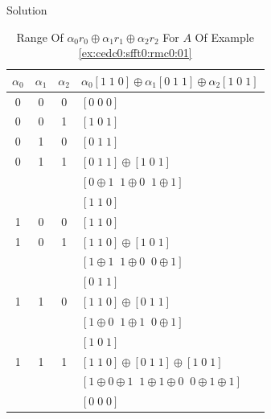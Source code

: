 \begin{vworkexampleparsection}{Solution}
\begin{table}
\caption{Range Of $\alpha_0 r_0 \oplus \alpha_1 r_1 \oplus \alpha_2 r_2$ For $A$ Of Example \ref{ex:cedc0:sfft0:rmc0:01}}
\label{tbl:cedc0:sfft0:rmc0:01}
\begin{center}
\begin{tabular}{|c|c|c|l|}
\hline
$\alpha_0$           &  $\alpha_1$                  & $\alpha_2$ &   $\alpha_0 [1 \; 1 \; 0] \oplus \alpha_1 [0 \; 1 \; 1] \oplus \alpha_2 [1 \; 0 \; 1]$   \\
\hline
\hline
0  & 0  & 0  & $[0\;0\;0]$ \\
\hline
0  & 0  & 1  & $[1\;0\;1]$ \\
\hline
0  & 1  & 0  & $[0\;1\;1]$ \\
\hline
0  & 1  & 1  & $[0\;1\;1] \oplus [1\;0\;1]$ \\
   &    &    & $[0 \oplus 1 \;\; 1 \oplus 0\;\; 1 \oplus 1]$ \\
   &    &    & $[1\;1\;0]$ \\
\hline
1  & 0  & 0  & $[1\;1\;0]$ \\
\hline
1  & 0  & 1  & $[1\;1\;0] \oplus [1\;0\;1]$ \\
   &    &    & $[1 \oplus 1 \;\; 1 \oplus 0\;\; 0 \oplus 1]$ \\
   &    &    & $[0\;1\;1]$ \\
\hline
1  & 1  & 0  & $[1\;1\;0] \oplus [0\;1\;1]$ \\
   &    &    & $[1 \oplus 0 \;\; 1 \oplus 1\;\; 0 \oplus 1]$ \\
   &    &    & $[1\;0\;1]$ \\
\hline
1  & 1  & 1  & $[1\;1\;0] \oplus [0\;1\;1] \oplus [1\;0\;1]$ \\
   &    &    & $[1 \oplus 0 \oplus 1 \;\; 1 \oplus 1 \oplus 0\;\; 0 \oplus 1 \oplus 1]$ \\
   &    &    & $[0\;0\;0]$ \\
\hline
\end{tabular}
\end{center}
\end{table}


\end{vworkexampleparsection}
